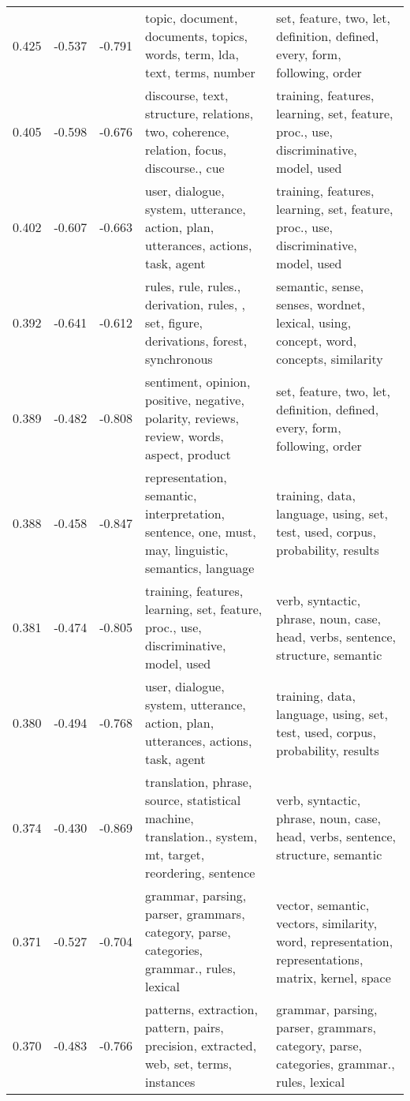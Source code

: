 \begin{tabular}{cccp{5cm}p{5cm}}
0.425 & -0.537 & -0.791 & topic, document, documents, topics, words, term, lda, text, terms, number & set, feature, two, let, definition, defined, every, form, following, order \\
0.405 & -0.598 & -0.676 & discourse, text, structure, relations, two, coherence, relation, focus, discourse., cue & training, features, learning, set, feature, proc., use, discriminative, model, used \\
0.402 & -0.607 & -0.663 & user, dialogue, system, utterance, action, plan, utterances, actions, task, agent & training, features, learning, set, feature, proc., use, discriminative, model, used \\
0.392 & -0.641 & -0.612 & rules, rule, rules., derivation, rules, , set, figure, derivations, forest, synchronous & semantic, sense, senses, wordnet, lexical, using, concept, word, concepts, similarity \\
0.389 & -0.482 & -0.808 & sentiment, opinion, positive, negative, polarity, reviews, review, words, aspect, product & set, feature, two, let, definition, defined, every, form, following, order \\
0.388 & -0.458 & -0.847 & representation, semantic, interpretation, sentence, one, must, may, linguistic, semantics, language & training, data, language, using, set, test, used, corpus, probability, results \\
0.381 & -0.474 & -0.805 & training, features, learning, set, feature, proc., use, discriminative, model, used & verb, syntactic, phrase, noun, case, head, verbs, sentence, structure, semantic \\
0.380 & -0.494 & -0.768 & user, dialogue, system, utterance, action, plan, utterances, actions, task, agent & training, data, language, using, set, test, used, corpus, probability, results \\
0.374 & -0.430 & -0.869 & translation, phrase, source, statistical machine, translation., system, mt, target, reordering, sentence & verb, syntactic, phrase, noun, case, head, verbs, sentence, structure, semantic \\
0.371 & -0.527 & -0.704 & grammar, parsing, parser, grammars, category, parse, categories, grammar., rules, lexical & vector, semantic, vectors, similarity, word, representation, representations, matrix, kernel, space \\
0.370 & -0.483 & -0.766 & patterns, extraction, pattern, pairs, precision, extracted, web, set, terms, instances & grammar, parsing, parser, grammars, category, parse, categories, grammar., rules, lexical \\

\end{tabular}
